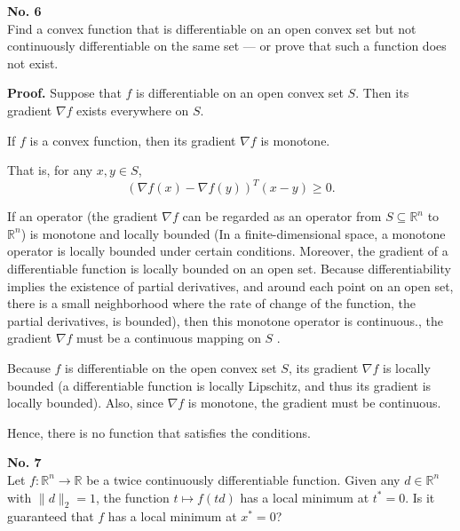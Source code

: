 \documentclass[a4paper, 11pt]{article}
\newenvironment{problem}[2][No.]
    { \begin{mdframed}[backgroundcolor=gray!5] \textbf{#1 #2} \\}
    {  \end{mdframed}}
\newenvironment{solution}
    {\textbf{Proof.}}
    {}
\begin{document}
\begin{problem}{6}
	Find a convex function that is differentiable on an open convex set but not continuously differentiable on the same set --- or prove that such a function does not exist.
	
\end{problem}

\begin{solution}
	Suppose that \( f \) is differentiable on an open convex set \( S \). Then its gradient \( \nabla f \) exists everywhere on \( S \). 
	
	 If \( f \) is a convex function, then its gradient \( \nabla f \) is monotone.
	
	That is, for any \( x, y \in S \), 
	$$ (\nabla f(x) - \nabla f(y))^T(x - y) \geq 0 .$$

	If an operator (the gradient \(\nabla f\) can be regarded as an operator from \(S\subseteq\mathbb{R}^n\) to \(\mathbb{R}^n\)) is monotone and locally bounded (In a finite-dimensional space, a monotone operator is locally bounded under certain conditions. Moreover, the gradient of a differentiable function is locally bounded on an open set. Because differentiability implies the existence of partial derivatives, and around each point on an open set, there is a small neighborhood where the rate of change of the function, the partial derivatives, is bounded), then this monotone operator is continuous., the gradient \( \nabla f \) must be a continuous mapping on \( S \) . 
	
	Because \( f \) is differentiable on the open convex set \( S \), its gradient \( \nabla f \) is locally bounded (a differentiable function is locally Lipschitz, and thus its gradient is locally bounded). Also, since \( \nabla f \) is monotone, the gradient must be continuous. 
	
	Hence, there is no function that satisfies the conditions. 
\end{solution}

\begin{problem}{7}
	Let \( f : \mathbb{R}^n \to \mathbb{R} \) be a twice continuously differentiable function. Given any \( d \in \mathbb{R}^n \) with \( \|d\|_2 = 1 \), the function \( t \mapsto f(td) \) has a local minimum at \( t^* = 0 \). Is it guaranteed that \( f \) has a local minimum at \( x^* = 0 \)?
\end{problem}
\end{document}
